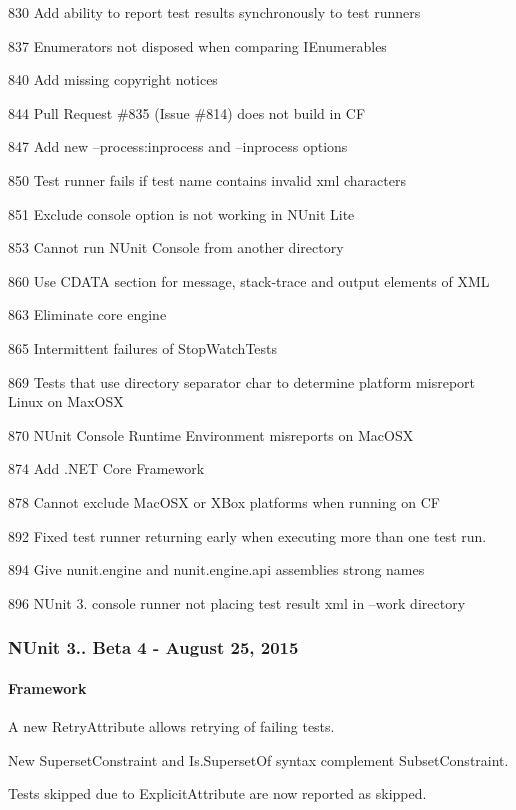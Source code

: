 \begin{DoxyItemize}
\item 830 Add ability to report test results synchronously to test runners
\item 837 Enumerators not disposed when comparing I\+Enumerables
\item 840 Add missing copyright notices
\item 844 Pull Request \#835 (Issue \#814) does not build in CF
\item 847 Add new --process\+:inprocess and --inprocess options
\item 850 Test runner fails if test name contains invalid xml characters
\item 851 \textquotesingle{}Exclude\textquotesingle{} console option is not working in N\+Unit Lite
\item 853 Cannot run N\+Unit Console from another directory
\item 860 Use C\+D\+A\+TA section for message, stack-\/trace and output elements of X\+ML
\item 863 Eliminate core engine
\item 865 Intermittent failures of Stop\+Watch\+Tests
\item 869 Tests that use directory separator char to determine platform misreport Linux on Max\+O\+SX
\item 870 N\+Unit Console Runtime Environment misreports on Mac\+O\+SX
\item 874 Add .N\+ET Core Framework
\item 878 Cannot exclude Mac\+O\+SX or X\+Box platforms when running on CF
\item 892 Fixed test runner returning early when executing more than one test run.
\item 894 Give nunit.\+engine and nunit.\+engine.\+api assemblies strong names
\item 896 N\+Unit 3. console runner not placing test result xml in --work directory
\end{DoxyItemize}

\subsubsection*{N\+Unit 3.. Beta 4 -\/ August 25, 2015}

\paragraph*{Framework}


\begin{DoxyItemize}
\item A new Retry\+Attribute allows retrying of failing tests.
\item New Superset\+Constraint and Is.\+Superset\+Of syntax complement Subset\+Constraint.
\item Tests skipped due to Explicit\+Attribute are now reported as skipped.
\end{DoxyItemize}

